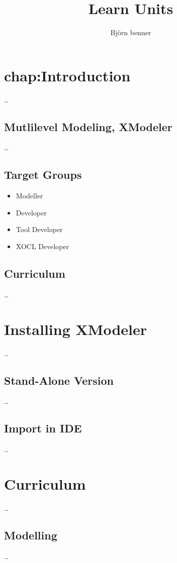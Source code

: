 \documentclass[10pt,a4paper]{report}
\author{Björn benner}
\title{Learn Units}
\begin{document}
\tableofcontents

\chapter{chap:Introduction}
\label{chap:Introduction}
\ldots

\section{Mutlilevel Modeling, XModeler}
\label{sec:XModeler}
\ldots

\section{Target Groups}
\label{sec:Target Groups}
\begin{itemize}
\item Modeller
\item Developer
\item Tool Developer
\item XOCL Developer
\end{itemize}

\section{Curriculum}
\label{sec:Curriculum}
\ldots

\chapter{Installing XModeler}
\label{chap:Installing XModeler}
\ldots

\section{Stand-Alone Version}
\label{sec:Stand-Alone Version}
\ldots

\section{Import in IDE}
\label{sec:Import in IDE}
\ldots

\chapter{Curriculum}
\label{chap:Curriculum}
\ldots

\section{Modelling}
\label{sec:Modelling}
\ldots
\end{document}
